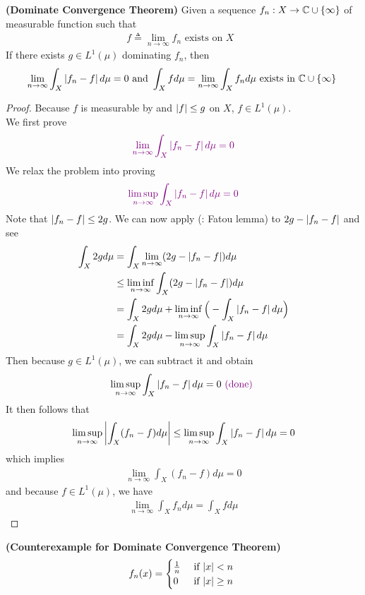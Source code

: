 \documentclass{report}
\begin{document}
\begin{theorem}
\label{LDCT}
\textbf{(Dominate Convergence Theorem)} Given a sequence $f_n:X\rightarrow \mathbb{C}\cup \{ \infty \}$ of measurable function such that 
\begin{align*}
f\triangleq \lim_{n\to \infty}f_n\text{ exists on $X$ }
\end{align*}
If there exists $g \in L^1(\mu)$ dominating $f_n$, then 
\begin{align*}
\lim_{n \to \infty} \int_X \left|f_n-f\right|d\mu=0\text{ and }\int_X fd\mu = \lim_{n\to \infty} \int_X f_n d\mu\text{ exists in $\mathbb{C}\cup  \{ \infty \}$ }
\end{align*}
\end{theorem}
\begin{proof}
Because $f$ is measurable by  and  $\left|f\right|\leq g$ on $X$, $f \in L^1(\mu)$.\\

We first prove 
\begin{align*}
  \textcolor{violet}{\lim_{n\to \infty}\int_X \left|f_n-f\right|d\mu=0}
\end{align*}
We relax the problem into proving 
\begin{align*}
  \textcolor{violet}{\limsup_{n\to\infty} \int_X \left|f_n-f\right|d\mu=0}
\end{align*}
Note that $\left|f_n-f\right|\leq 2g$. We can now apply (: Fatou lemma) to $2g- \left|f_n-f\right|$ and see 
\begin{align*}
\int_X 2gd\mu&=   \int_X \lim_{n\to \infty}(2g- \left|f_n-f\right|)d\mu \\
&\leq \liminf_{n\to\infty} \int_X (2g-\left|f_n-f\right|)d\mu\\
&= \int_X 2gd\mu + \liminf_{n\to\infty} \Big(- \int_X \left|f_n-f\right|d\mu \Big)\\
&=\int_X 2gd\mu - \limsup_{n\to\infty} \int_X \left|f_n-f\right|d\mu
\end{align*}
Then because $g \in L^1(\mu)$, we can subtract it and obtain 
\begin{align*}
\limsup_{n\to\infty}\int_X  \left|f_n-f\right|d\mu=0 \textcolor{violet}{\text{ (done) }}
\end{align*}
It then follows that 
\begin{align*}
  \limsup_{n\to\infty} \left|\int_X (f_n-f)d\mu\right| \leq \limsup_{n\to\infty} \int_X \left|f_n-f\right|d\mu =0
\end{align*}
which implies 
\begin{align*}
\lim_{n\to \infty} \int_X (f_n-f)d\mu =0
\end{align*}
and because $f\in L^1(\mu)$, we have
\begin{align*}
\lim_{n\to \infty}\int_X f_nd\mu = \int_X fd\mu
\end{align*}
\end{proof}
\begin{Example}{\textbf{(Counterexample for Dominate Convergence Theorem)}}{}
\begin{align*}
f_n(x)=\begin{cases}
  \frac{1}{n}& \text{ if $\left|x\right|<n$ }\\
  0& \text{ if $\left|x\right|\geq n$ }
\end{cases}
\end{align*}
\end{Example}
\end{document}
